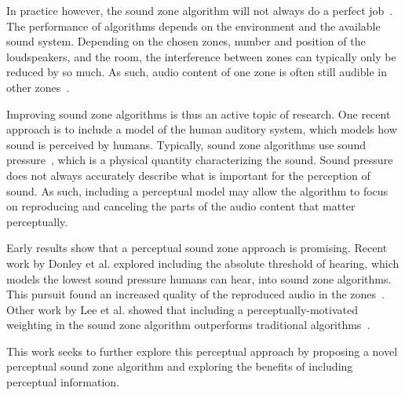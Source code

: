 In practice however, the sound zone algorithm will not always do a perfect job~\cite{moller2016sound}.
The performance of algorithms depends on the environment and the available sound system.
Depending on the chosen zones, number and position of the loudspeakers, and the room, the interference between zones can typically only be reduced by so much.
As such, audio content of one zone is often still audible in other zones~\cite{moller2016sound}.

Improving sound zone algorithms is thus an active topic of research.
One recent approach is to include a model of the human auditory system, which models how sound is perceived by humans.
Typically, sound zone algorithms use sound pressure~\cite{betlehem2015personal}, which is a physical quantity characterizing the sound.
Sound pressure does not always accurately describe what is important for the perception of sound.
As such, including a perceptual model may allow the algorithm to focus on reproducing and canceling the parts of the audio content
that matter perceptually.

Early results show that a perceptual sound zone approach is promising.
Recent work by Donley et al. explored including the absolute threshold of hearing, which models the lowest sound pressure
humans can hear, into sound zone algorithms.
This pursuit found an increased quality of the reproduced audio in the zones~\cite{donley2015multizone}.
Other work by Lee et al. showed that including a perceptually-motivated weighting in the sound zone algorithm outperforms 
traditional algorithms~\cite{lee2019towards,lee2020signal}.

This work seeks to further explore this perceptual approach by proposing a novel perceptual sound zone algorithm and exploring
the benefits of including perceptual information.

